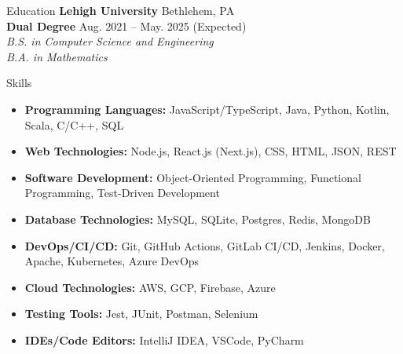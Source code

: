 \documentclass{resume}
\begin{document}
\begin{rSection}{Education}
{\bf Lehigh University} \hfill { Bethlehem, PA } \\
{\bf Dual Degree} \hfill {Aug. 2021 – May. 2025 (Expected)} \\
{\emph{B.S. in Computer Science and Engineering}} \\
{\emph{B.A. in Mathematics}}
\end{rSection}

\begin{rSection}{Skills}
    \begin{itemize}
        \itemsep -5pt {} 
        \item \textbf{Programming Languages:} JavaScript/TypeScript, Java, Python, Kotlin, Scala, C/C++, SQL
        \item \textbf{Web Technologies:} Node.js, React.js (Next.js), CSS, HTML, JSON, REST
        \item \textbf{Software Development:} Object-Oriented Programming, Functional Programming, Test-Driven Development
        \item \textbf{Database Technologies:} MySQL, SQLite, Postgres, Redis, MongoDB
        \item \textbf{DevOps/CI/CD:} Git, GitHub Actions, GitLab CI/CD, Jenkins, Docker, Apache, Kubernetes, Azure DevOps
        \item \textbf{Cloud Technologies:} AWS, GCP, Firebase, Azure
        \item \textbf{Testing Tools:} Jest, JUnit, Postman, Selenium
        \item \textbf{IDEs/Code Editors:} IntelliJ IDEA, VSCode, PyCharm
    \end{itemize}
\end{rSection}
\end{document}
